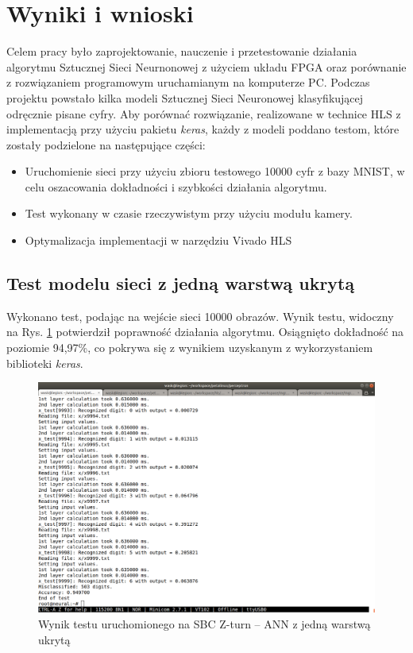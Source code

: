 \newpage %
\cleardoublepage %
\pagestyle{headings}

\section{Wyniki i wnioski}

Celem pracy było zaprojektowanie, nauczenie i przetestowanie działania algorytmu Sztucznej Sieci Neurnonowej z użyciem 
układu FPGA oraz porównanie z rozwiązaniem programowym uruchamianym na komputerze PC. Podczas projektu powstało kilka modeli Sztucznej Sieci 
Neuronowej klasyfikującej odręcznie pisane cyfry.
Aby porównać rozwiązanie, realizowane w technice HLS z implementacją przy użyciu pakietu \emph{keras}, każdy z modeli poddano testom, które zostały podzielone na następujące części:

\begin{itemize}
  \item Uruchomienie sieci przy użyciu zbioru testowego 10000 cyfr z bazy MNIST, w celu oszacowania dokładności i 
  szybkości działania algorytmu.
  \item Test wykonany w czasie rzeczywistym przy użyciu modułu kamery.
  \item Optymalizacja implementacji w narzędziu Vivado HLS
\end{itemize}

\subsection{Test modelu sieci z jedną warstwą ukrytą}

Wykonano test, podając na wejście sieci 10000 obrazów. Wynik testu, widoczny na Rys. \ref{wynik1} potwierdził poprawność działania algorytmu. Osiągnięto dokładność na poziomie 94,97\%, co pokrywa się z wynikiem uzyskanym z wykorzystaniem biblioteki \emph{keras}.

\begin{figure}[!h]
    \centering
    \includegraphics[width=\textwidth]{img/wynik1.png}
    \caption{Wynik testu uruchomionego na SBC Z-turn -- ANN z jedną warstwą ukrytą}
    \label{wynik1}
  \end{figure}


